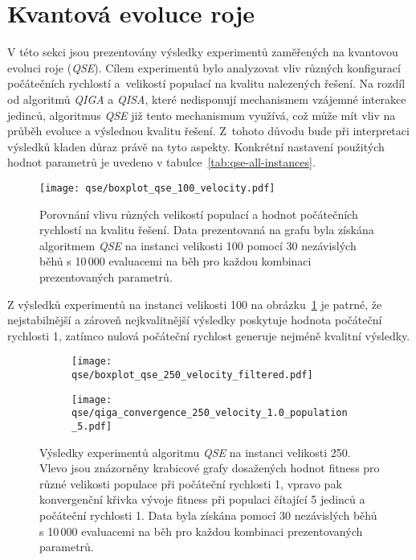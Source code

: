 \section{Kvantová evoluce roje}\label{sec:exp-qse}
V této sekci jsou prezentovány výsledky experimentů zaměřených na kvantovou evoluci roje (\emph{QSE}). 
Cílem experimentů bylo analyzovat vliv různých konfigurací počátečních rychlostí a~velikostí populací na kvalitu nalezených řešení. 
Na rozdíl od algoritmů \emph{QIGA} a \emph{QISA}, které nedisponují mechanismem vzájemné interakce jedinců, algoritmus \emph{QSE} již tento mechanismum využívá, což může mít vliv na průběh evoluce a výslednou kvalitu řešení. 
Z~tohoto důvodu bude při interpretaci výsledků kladen důraz právě na tyto aspekty.
Konkrétní nastavení použitých hodnot parametrů je uvedeno v tabulce~\ref{tab:qse-all-instances}. 

\begin{figure}[ht!]
    \centering
    \texttt{[image: qse/boxplot\_qse\_100\_velocity.pdf]}
    \caption{Porovnání vlivu různých velikostí populací a hodnot počátečních rychlostí na kvalitu řešení. Data prezentovaná na grafu byla získána algoritmem \emph{QSE} na instanci velikosti 100 pomocí 30 nezávislých běhů s 10\,000 evaluacemi na běh pro každou kombinaci prezentovaných parametrů.}
    \label{fig:qse-100-all}
\end{figure}

Z výsledků experimentů na instanci velikosti 100 na obrázku~\ref{fig:qse-100-all} je patrné, že nejstabilnější a zároveň nejkvalitnější výsledky poskytuje hodnota počáteční rychlosti 1, zatímco nulová počáteční rychlost generuje nejméně kvalitní výsledky. 

\begin{figure}[ht!]
    \centering
    \begin{subfigure}[b]{0.45\textwidth}
      \texttt{[image: qse/boxplot\_qse\_250\_velocity\_filtered.pdf]}
    \end{subfigure}
    \hfill
    \begin{subfigure}[b]{0.48\textwidth}
        \texttt{[image: qse/qiga\_convergence\_250\_velocity\_1.0\_population\_5.pdf]}
    \end{subfigure}
    \caption{Výsledky experimentů algoritmu \emph{QSE} na instanci velikosti 250. Vlevo jsou znázorněny krabicové grafy dosažených hodnot fitness pro různé velikosti populace při počáteční rychlosti 1, vpravo pak konvergenční křivka vývoje fitness při populaci čítající 5 jedinců a počáteční rychlosti 1. Data byla získána pomocí 30 nezávislých běhů s 10\,000 evaluacemi na běh pro každou kombinaci prezentovaných parametrů.}
    \label{fig:qse-250-mix}
\end{figure}

